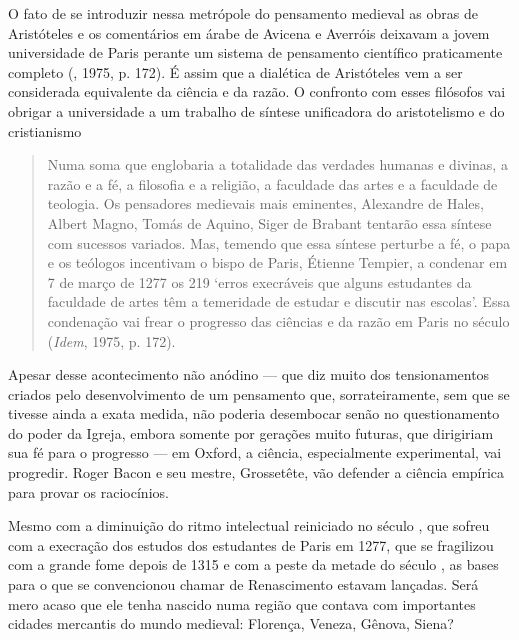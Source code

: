 O fato de se introduzir nessa metrópole do pensamento medieval as obras
de Aristóteles e os comentários em árabe de Avicena e Averróis deixavam
a jovem universidade de Paris perante um sistema de pensamento
científico praticamente completo (, 1975, p. 172). É assim que a
dialética de Aristóteles vem a ser considerada equivalente da ciência e
da razão. O confronto com esses filósofos vai obrigar a universidade a
um trabalho de síntese unificadora do aristotelismo e do cristianismo

\begin{quote}
Numa soma que englobaria a totalidade das verdades humanas e divinas, a
razão e a fé, a filosofia e a religião, a faculdade das artes e a
faculdade de teologia. Os pensadores medievais mais eminentes, Alexandre
de Hales, Albert Magno, Tomás de Aquino, Siger de Brabant tentarão essa
síntese com sucessos variados. Mas, temendo que essa síntese perturbe a
fé, o papa e os teólogos incentivam o bispo de Paris, Étienne Tempier, a
condenar em 7 de março de 1277 os 219 `erros execráveis que alguns
estudantes da faculdade de artes têm a temeridade de estudar e discutir
nas escolas'. Essa condenação vai frear o progresso das ciências e da
razão em Paris no século  (\emph{Idem}, 1975, p. 172).
\end{quote}

Apesar desse acontecimento não anódino --- que diz muito dos
tensionamentos criados pelo desenvolvimento de um pensamento que,
sorrateiramente, sem que se tivesse ainda a exata medida, não poderia
desembocar senão no questionamento do poder da Igreja, embora somente
por gerações muito futuras, que dirigiriam sua fé para o progresso --- em
Oxford, a ciência, especialmente experimental, vai progredir. Roger
Bacon e seu mestre, Grossetête, vão defender a ciência empírica para
provar os raciocínios.

Mesmo com a diminuição do ritmo intelectual reiniciado no século , que
sofreu com a execração dos estudos dos estudantes de Paris em 1277, que
se fragilizou com a grande fome depois de 1315 e com a peste da metade
do século , as bases para o que se convencionou chamar de
Renascimento estavam lançadas. Será mero acaso que ele tenha nascido
numa região que contava com importantes cidades mercantis do mundo
medieval: Florença, Veneza, Gênova, Siena?


